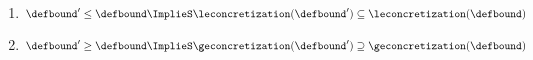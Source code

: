 ~

\begin{enumerate}[label=(\roman*)]
  \item $\defbound' \le \defbound \ImplieS \leconcretization(\defbound') \subseteq \leconcretization(\defbound)$
  \item $\defbound' \ge \defbound \ImplieS \geconcretization(\defbound') \supseteq \geconcretization(\defbound)$
\end{enumerate}

